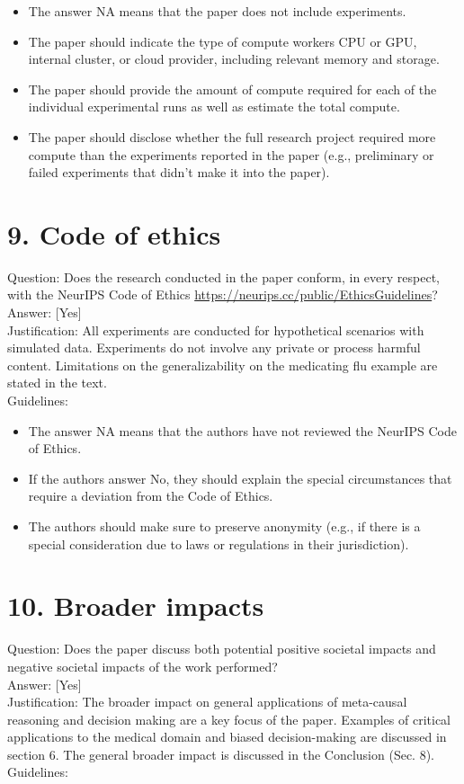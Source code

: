 \documentclass[10pt]{article}
\begin{document}
\begin{itemize}
  \item The answer NA means that the paper does not include experiments.
  \item The paper should indicate the type of compute workers CPU or GPU, internal cluster, or cloud provider, including relevant memory and storage.
  \item The paper should provide the amount of compute required for each of the individual experimental runs as well as estimate the total compute.
  \item The paper should disclose whether the full research project required more compute than the experiments reported in the paper (e.g., preliminary or failed experiments that didn't make it into the paper).
\end{itemize}

\section*{9. Code of ethics}
Question: Does the research conducted in the paper conform, in every respect, with the NeurIPS Code of Ethics \href{https://neurips.cc/public/EthicsGuidelines}{https://neurips.cc/public/EthicsGuidelines}?\\[0pt]
Answer: [Yes]\\
Justification: All experiments are conducted for hypothetical scenarios with simulated data. Experiments do not involve any private or process harmful content. Limitations on the generalizability on the medicating flu example are stated in the text.\\
Guidelines:

\begin{itemize}
  \item The answer NA means that the authors have not reviewed the NeurIPS Code of Ethics.
  \item If the authors answer No, they should explain the special circumstances that require a deviation from the Code of Ethics.
  \item The authors should make sure to preserve anonymity (e.g., if there is a special consideration due to laws or regulations in their jurisdiction).
\end{itemize}

\section*{10. Broader impacts}
Question: Does the paper discuss both potential positive societal impacts and negative societal impacts of the work performed?\\[0pt]
Answer: [Yes]\\
Justification: The broader impact on general applications of meta-causal reasoning and decision making are a key focus of the paper. Examples of critical applications to the medical domain and biased decision-making are discussed in section 6. The general broader impact is discussed in the Conclusion (Sec. 8).\\
Guidelines:
\end{document}
